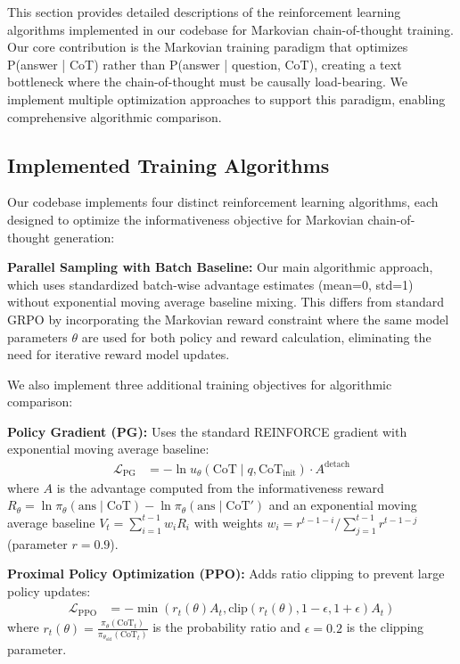 \documentclass{article}
\begin{document}
This section provides detailed descriptions of the reinforcement learning algorithms implemented in our codebase for Markovian chain-of-thought training. Our core contribution is the Markovian training paradigm that optimizes P(answer | CoT) rather than P(answer | question, CoT), creating a text bottleneck where the chain-of-thought must be causally load-bearing. We implement multiple optimization approaches to support this paradigm, enabling comprehensive algorithmic comparison.

\subsection{Implemented Training Algorithms}

Our codebase implements four distinct reinforcement learning algorithms, each designed to optimize the informativeness objective for Markovian chain-of-thought generation:

\textbf{Parallel Sampling with Batch Baseline:} Our main algorithmic approach, which uses standardized batch-wise advantage estimates (mean=0, std=1) without exponential moving average baseline mixing. This differs from standard GRPO by incorporating the Markovian reward constraint where the same model parameters $\theta$ are used for both policy and reward calculation, eliminating the need for iterative reward model updates.

We also implement three additional training objectives for algorithmic comparison:

\textbf{Policy Gradient (PG):} Uses the standard REINFORCE gradient with exponential moving average baseline:
\begin{align}
\mathcal{L}_{\text{PG}} &= -\ln u_\theta(\text{CoT} \mid q, \text{CoT}_{\text{init}}) \cdot A^{\text{detach}}
\end{align}
where $A$ is the advantage computed from the informativeness reward $R_\theta = \ln \pi_\theta(\text{ans} \mid \text{CoT}) - \ln \pi_\theta(\text{ans} \mid \text{CoT}')$ and an exponential moving average baseline $V_t = \sum_{i=1}^{t-1} w_i R_i$ with weights $w_i = r^{t-1-i} / \sum_{j=1}^{t-1} r^{t-1-j}$ (parameter $r = 0.9$).

\textbf{Proximal Policy Optimization (PPO):} Adds ratio clipping to prevent large policy updates:
\begin{align}
\mathcal{L}_{\text{PPO}} &= -\min(r_t(\theta) A_t, \text{clip}(r_t(\theta), 1-\epsilon, 1+\epsilon) A_t)
\end{align}
where $r_t(\theta) = \frac{\pi_\theta(\text{CoT}_t)}{\pi_{\theta_{\text{old}}}(\text{CoT}_t)}$ is the probability ratio and $\epsilon = 0.2$ is the clipping parameter.
\end{document}
